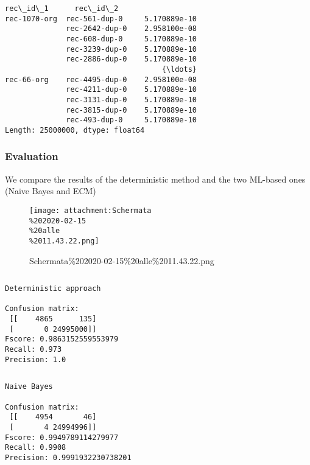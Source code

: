 \documentclass{article}
\begin{document}
    \begin{Verbatim}[commandchars=\\\{\}]
rec\_id\_1      rec\_id\_2      
rec-1070-org  rec-561-dup-0     5.170889e-10
              rec-2642-dup-0    2.958100e-08
              rec-608-dup-0     5.170889e-10
              rec-3239-dup-0    5.170889e-10
              rec-2886-dup-0    5.170889e-10
                                    {\ldots}     
rec-66-org    rec-4495-dup-0    2.958100e-08
              rec-4211-dup-0    5.170889e-10
              rec-3131-dup-0    5.170889e-10
              rec-3815-dup-0    5.170889e-10
              rec-493-dup-0     5.170889e-10
Length: 25000000, dtype: float64

    \end{Verbatim}

    \hypertarget{evaluation}{%
\subsubsection{Evaluation}\label{evaluation}}

We compare the results of the deterministic method and the two ML-based
ones (Naive Bayes and ECM)

    \begin{figure}
\centering
\texttt{[image: attachment:Schermata\\\%202020-02-15\\\%20alle\\\%2011.43.22.png]}
\caption{Schermata\%202020-02-15\%20alle\%2011.43.22.png}
\end{figure}

    \begin{Verbatim}[commandchars=\\\{\}]

\end{Verbatim}

    \begin{Verbatim}[commandchars=\\\{\}]
Deterministic approach 

Confusion matrix: 
 [[    4865      135]
 [       0 24995000]]
Fscore: 0.9863152559553979
Recall: 0.973
Precision: 1.0

    \end{Verbatim}

    \begin{Verbatim}[commandchars=\\\{\}]

\end{Verbatim}

    \begin{Verbatim}[commandchars=\\\{\}]
Naive Bayes 

Confusion matrix: 
 [[    4954       46]
 [       4 24994996]]
Fscore: 0.9949789114279977
Recall: 0.9908
Precision: 0.9991932230738201

    \end{Verbatim}
\end{document}
